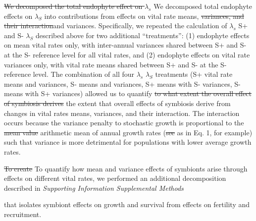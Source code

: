 \documentclass[lineno,sn-nature]{sn-jnl}%
\providecommand{\DIFadd}[1]{{\protect\color{blue}#1}} %
\providecommand{\DIFdel}[1]{{\protect\color{red}\protect\scriptsize\sout{#1}}}
\providecommand{\DIFadd}[1]{{\protect\color{blue}\uwave{#1}}} %
\providecommand{\DIFdel}[1]{{\protect\color{red}\sout{#1}}}                      %
\providecommand{\DIFaddbegin}{} %
\providecommand{\DIFaddend}{} %
\providecommand{\DIFdelbegin}{} %
\providecommand{\DIFdelend}{} %
\newcommand{\DIFscaledelfig}{0.5}
\newlength{\DIFdelgraphicswidth} %
\newlength{\DIFdelgraphicsheight} %
\newcommand{\DIFaddincludegraphics}[2][]{{\color{blue}\fbox{\DIFOincludegraphics[#1]{#2}}}} %
\newcommand{\DIFdelincludegraphics}[2][]{%
\sbox{\DIFdelgraphicsbox}{\DIFOincludegraphics[#1]{#2}}%
\settoboxwidth{\DIFdelgraphicswidth}{\DIFdelgraphicsbox} %
\settoboxtotalheight{\DIFdelgraphicsheight}{\DIFdelgraphicsbox} %
\scalebox{\DIFscaledelfig}{%
\parbox[b]{\DIFdelgraphicswidth}{\usebox{\DIFdelgraphicsbox}\\[-\baselineskip] \rule{\DIFdelgraphicswidth}{0em}}\llap{\resizebox{\DIFdelgraphicswidth}{\DIFdelgraphicsheight}{%
\setlength{\unitlength}{\DIFdelgraphicswidth}%
\begin{picture}(1,1)%
\thicklines\linethickness{2pt} %
{\color[rgb]{1,0,0}\put(0,0){\framebox(1,1){}}}%
{\color[rgb]{1,0,0}\put(0,0){\line( 1,1){1}}}%
{\color[rgb]{1,0,0}\put(0,1){\line(1,-1){1}}}%
\end{picture}%
}\hspace*{3pt}}} %
} %
\DeclareRobustCommand{\DIFaddbegin}{\DIFOaddbegin \let\includegraphics\DIFaddincludegraphics} %
\DeclareRobustCommand{\DIFaddend}{\DIFOaddend \let\includegraphics\DIFOincludegraphics} %
\DeclareRobustCommand{\DIFdelbegin}{\DIFOdelbegin \let\includegraphics\DIFdelincludegraphics} %
\DeclareRobustCommand{\DIFdelend}{\DIFOaddend \let\includegraphics\DIFOincludegraphics} %
\begin{document}
\DIFdel{We decomposed the total endophyte effect on $\lambda_s$ }\DIFdelend \DIFaddbegin \DIFadd{We decomposed total endophyte effects on $\lambda_S$ }\DIFaddend into contributions from effects on vital rate means, \DIFdelbegin \DIFdel{variances, and their interaction}\DIFdelend \DIFaddbegin \DIFadd{and variances}\DIFaddend . 
	Specifically, we repeated the calculation of \DIFdelbegin \DIFdel{$\lambda_s$ }\DIFdelend \DIFaddbegin \DIFadd{S+ and S- $\lambda_S$ described above }\DIFaddend for two additional ``treatments'': (1) endophyte effects on mean vital rates only, with inter-annual variances shared between S+ and S- at the S- reference level for all vital rates, and (2) endophyte effects on vital rate variances only, with vital rate means shared between S+ and S- at the S- reference level. 
	The combination of all four \DIFdelbegin \DIFdel{$\lambda_s$ }\DIFdelend \DIFaddbegin \DIFadd{$\lambda_S$ }\DIFaddend treatments (S+ vital rate means and variances, S- means and variances, S+ means with S- variances, S- means with S+ variances) allowed us to quantify \DIFdelbegin \DIFdel{to what extent the overall effect of symbiosis derives }\DIFdelend \DIFaddbegin \DIFadd{the extent that overall effects of symbiosis derive }\DIFaddend from changes in vital rates means, variances, and their interaction. 
	The interaction occurs because the variance penalty to stochastic growth is proportional to the \DIFdelbegin \DIFdel{mean value }\DIFdelend \DIFaddbegin \DIFadd{arithmetic mean }\DIFaddend of annual growth rates (\DIFdelbegin \DIFdel{see }\DIFdelend \DIFaddbegin \DIFadd{as in }\DIFaddend Eq. 1\DIFaddbegin \DIFadd{, for example}\DIFaddend ) such that variance is more detrimental for populations with lower average growth rates. 

\DIFdelbegin %

\DIFdel{To create }\DIFdelend \DIFaddbegin \DIFadd{To quantify how mean and variance effects of symbionts arise through effects on different vital rates, we performed an additional decomposition described in }\emph{\DIFadd{Supporting Information Supplemental Methods}} \DIFadd{that isolates symbiont effects on growth and survival from effects on fertility and recruitment.

}
\end{document}
